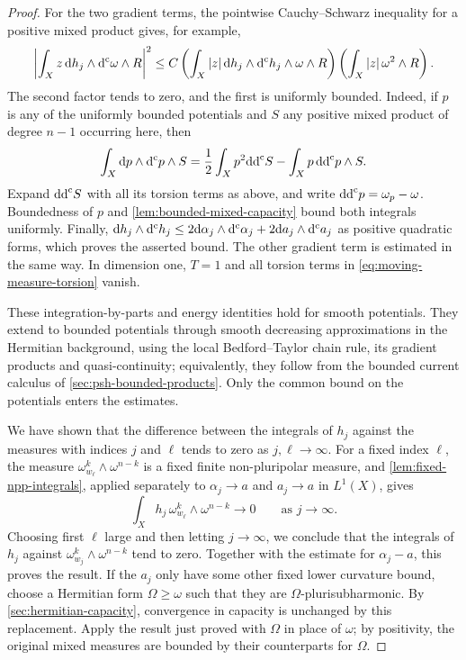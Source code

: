 \begin{proof}
For the two gradient terms, the pointwise Cauchy--Schwarz inequality for a positive mixed product gives, for example,
\[
 \left|\int_Xz\,\mathrm{d}h_j\wedge\mathrm d^{\mathrm c}\omega\wedge R\right|^2
 \leq C\left(\int_X|z|\,\mathrm{d}h_j\wedge\mathrm d^{\mathrm c} h_j\wedge\omega\wedge R\right)
          \left(\int_X|z|\,\omega^2\wedge R\right).
\]
The second factor tends to zero, and the first is uniformly bounded. Indeed, if $p$ is any of the uniformly bounded potentials and $S$ any positive mixed product of degree $n-1$ occurring here, then
\[
 \int_X\mathrm{d}p\wedge\mathrm d^{\mathrm c} p\wedge S
 =\frac12\int_Xp^2\mathrm{dd}^{\mathrm{c}} S-\int_Xp\,\mathrm{dd}^{\mathrm{c}} p\wedge S.
\]
Expand $\mathrm{dd}^{\mathrm{c}} S$ with all its torsion terms as above, and write $\mathrm{dd}^{\mathrm{c}} p=\omega_p-\omega$. Boundedness of $p$ and \cref{lem:bounded-mixed-capacity} bound both integrals uniformly. Finally, $\mathrm{d}h_j\wedge\mathrm d^{\mathrm c} h_j\leq2\mathrm{d}\alpha_j\wedge\mathrm d^{\mathrm c}\alpha_j+2\mathrm{d}a_j\wedge\mathrm d^{\mathrm c} a_j$ as positive quadratic forms, which proves the asserted bound. The other gradient term is estimated in the same way. In dimension one, $T=1$ and all torsion terms in \eqref{eq:moving-measure-torsion} vanish.

These integration-by-parts and energy identities hold for smooth potentials. They extend to bounded potentials through smooth decreasing approximations in the Hermitian background, using the local Bedford--Taylor chain rule, its gradient products and quasi-continuity; equivalently, they follow from the bounded current calculus of \cref{sec:psh-bounded-products}. Only the common bound on the potentials enters the estimates.

We have shown that the difference between the integrals of $h_j$ against the measures with indices $j$ and $\ell$ tends to zero as $j,\ell\to\infty$. For a fixed index $\ell$, the measure $\omega_{w_\ell}^k\wedge\omega^{n-k}$ is a fixed finite non-pluripolar measure, and \cref{lem:fixed-npp-integrals}, applied separately to $\alpha_j\to a$ and $a_j\to a$ in $L^1(X)$, gives
\[
 \int_Xh_j\,\omega_{w_\ell}^{k}\wedge\omega^{n-k}\longrightarrow0
 \qquad\text{as }j\to\infty.
\]
Choosing first $\ell$ large and then letting $j\to\infty$, we conclude that the integrals of $h_j$ against $\omega_{w_j}^k\wedge\omega^{n-k}$ tend to zero. Together with the estimate for $\alpha_j-a$, this proves the result. If the $a_j$ only have some other fixed lower curvature bound, choose a Hermitian form $\Omega\geq\omega$ such that they are $\Omega$-plurisubharmonic. By \cref{sec:hermitian-capacity}, convergence in capacity is unchanged by this replacement. Apply the result just proved with $\Omega$ in place of $\omega$; by positivity, the original mixed measures are bounded by their counterparts for $\Omega$.
\end{proof}

